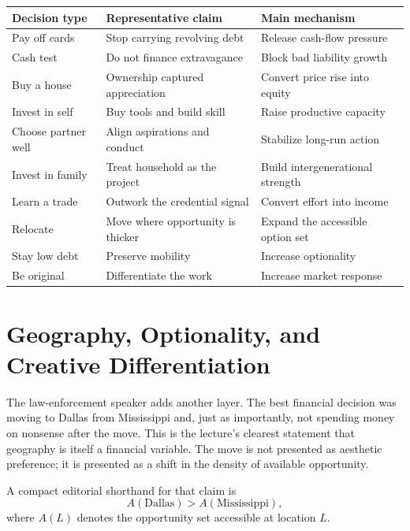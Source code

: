 \begin{table}
\begin{center}
\begin{tabular}{|l|l|l|}
\hline
Decision type & Representative claim & Main mechanism \\
\hline
Pay off cards & Stop carrying revolving debt & Release cash-flow pressure \\
Cash test & Do not finance extravagance & Block bad liability growth \\
Buy a house & Ownership captured appreciation & Convert price rise into equity \\
Invest in self & Buy tools and build skill & Raise productive capacity \\
Choose partner well & Align aspirations and conduct & Stabilize long-run action \\
Invest in family & Treat household as the project & Build intergenerational strength \\
Learn a trade & Outwork the credential signal & Convert effort into income \\
Relocate & Move where opportunity is thicker & Expand the accessible option set \\
Stay low debt & Preserve mobility & Increase optionality \\
Be original & Differentiate the work & Increase market response \\
\hline
\end{tabular}
\end{center}
\end{table}

\section{Geography, Optionality, and Creative Differentiation}

The law-enforcement speaker adds another layer. The best financial decision was moving to Dallas from Mississippi and, just as importantly, not spending money on nonsense after the move. This is the lecture's clearest statement that geography is itself a financial variable. The move is not presented as aesthetic preference; it is presented as a shift in the density of available opportunity.

A compact editorial shorthand for that claim is
\begin{equation}
A(\text{Dallas}) > A(\text{Mississippi}),
\end{equation}
where \(A(L)\) denotes the opportunity set accessible at location \(L\).

